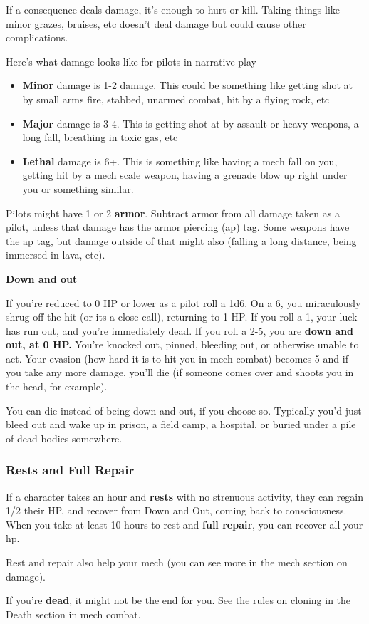 If a consequence deals damage, it’s enough to hurt or kill. Taking things like minor grazes, bruises, etc doesn’t deal damage but could cause other complications.

Here’s what damage looks like for pilots in narrative play
\begin{itemize}
\item \textbf{Minor} damage is 1-2 damage. This could be something like getting shot at by small arms fire, stabbed, unarmed combat, hit by a flying rock, etc
\item \textbf{Major} damage is 3-4. This is getting shot at by assault or heavy weapons, a long fall, breathing in toxic gas, etc
\item \textbf{Lethal} damage is 6+. This is something like having a mech fall on you, getting hit by a mech scale weapon, having a grenade blow up right under you or something similar.
\end{itemize}  

Pilots might have 1 or 2 \textbf{armor}. Subtract armor from all damage taken as a pilot, unless that damage has the armor piercing (ap) tag. Some weapons have the ap tag, but damage outside of that might also (falling a long distance, being immersed in lava, etc).

                                                \textbf{Down and out} 

If you’re reduced to 0 HP or lower as a pilot roll a 1d6. On a 6, you miraculously shrug off the hit (or its a close call), returning to 1 HP. If you roll a 1, your luck has run out, and you’re immediately dead. If you roll a 2-5, you are \textbf{down and out, at 0 HP.} You’re knocked out, pinned, bleeding out, or otherwise unable to act. Your evasion (how hard it is to hit you in mech combat) becomes 5 and if you take any more damage, you’ll die (if someone comes over and shoots you in the head, for example).

You can die instead of being down and out, if you choose so. Typically you’d just bleed out and wake up in prison, a field camp, a hospital, or buried under a pile of dead bodies somewhere.

\subsubsection{Rests and Full Repair}

If a character takes an hour and \textbf{rests} with no strenuous activity, they can regain 1/2 their HP, and recover from Down and Out, coming back to consciousness. When you take at least 10 hours to rest and \textbf{full repair}, you can recover all your hp. 

Rest and repair also help your mech (you can see more in the mech section on damage). 

If you’re \textbf{dead}, it might not be the end for you. See the rules on cloning in the Death section in mech combat.